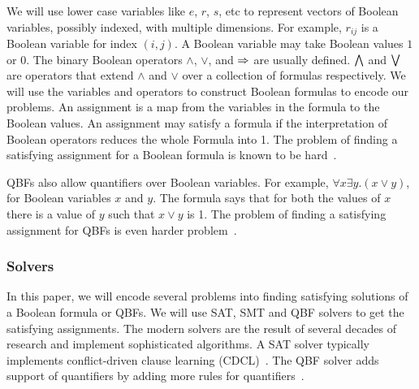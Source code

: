 \noindent We will use lower case variables like $e$, $r$, $s$, etc to represent vectors of
Boolean variables, possibly indexed, with multiple dimensions.
%
For example, $r_{ij}$ is a Boolean variable for index $(i,j)$.
%
%
A Boolean variable may take Boolean values $1$ or $0$.
%
The binary Boolean operators $\land$, $\lor$, and $\Rightarrow$ are usually defined.
%
$\bigwedge$ and $\bigvee$ are operators that extend $\land$ and $\lor$ over a collection of formulas respectively.
%
We will use the variables and operators to construct Boolean formulas to
encode our problems.
%
An assignment is a map from the variables in the formula to the Boolean values.
%
An assignment may satisfy a formula if the interpretation of Boolean operators
reduces the whole Formula into 1.
%
The problem of finding a satisfying assignment for a Boolean formula is known to be hard~\cite{cook1971complexity}.
%

QBFs also allow quantifiers over Boolean variables.
%
For example, $\forall x \exists y. (x \lor y)$, for Boolean variables $x$ and $y$.
%
The formula says that for both the values of $x$ there is a value of $y$
such that $x \lor y$ is 1.
%
The problem of finding a satisfying assignment for QBFs is even harder problem~\cite{savitch1970relationships, stockmeyer1973word}.
%

\subsubsection{Solvers}
In this paper, we will encode several problems into finding satisfying
solutions of a Boolean formula or QBFs.
%
We will use SAT, SMT and QBF solvers to get the satisfying assignments.
%
The modern solvers are the result of several decades of research
and implement sophisticated algorithms.
%
A SAT solver typically implements conflict-driven clause learning (CDCL)~\cite{biere2009conflict}.
The QBF solver adds support of quantifiers by adding more rules for quantifiers~\cite{buning2009theory}.

%
%

